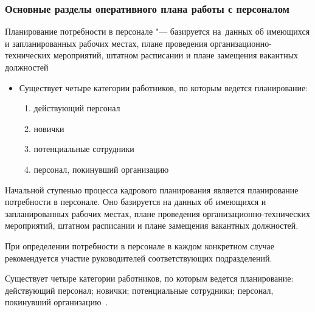 \documentclass{../industrial-development}
\begin{document}
\begin{frame} \frametitle{Основные разделы оперативного плана работы с персоналом}
\alert{Планирование потребности в персонале} "--- базируется на~данных об имеющихся и запланированных рабочих местах, плане проведения организационно-технических мероприятий, штатном расписании и плане замещения вакантных должностей
  \begin{itemize}
	\item Существует четыре категории работников, по которым ведется планирование:
	  \begin{enumerate}
	\item	действующий персонал
	\item	новички
	\item	потенциальные сотрудники
	\item	персонал, покинувший организацию
	  \end{enumerate}
	  \end{itemize}
\end{frame}

\lecturenotes

Начальной ступенью процесса кадрового планирования является планирование потребности в персонале. Оно базируется на данных об имеющихся и запланированных рабочих местах, плане проведения организационно-технических мероприятий, штатном расписании и плане замещения вакантных должностей.

При определении потребности в персонале в каждом конкретном случае рекомендуется участие руководителей соответствующих подразделений.

Существует четыре категории работников, по которым ведется планирование: действующий персонал; новички; потенциальные сотрудники; персонал, покинувший организацию~\cite[с.~88]{Ivanova}.
\end{document}
